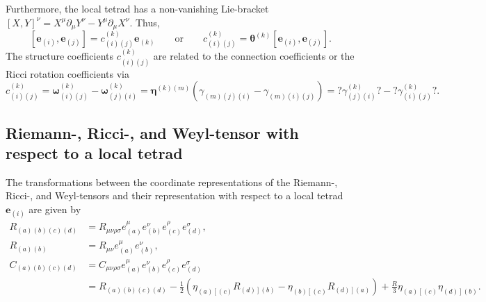 \documentclass[10pt,twoside,notitlepage,a4paper,fleqn,openbib]{report}
\def\antil{\left[\right.}
\def\antir{\left.\right]}
\begin{document}
Furthermore, the local tetrad has a non-vanishing Lie-bracket $[X,Y]^{\nu}=X^{\mu}\partial_{\mu}Y^{\nu}-Y^{\mu}\partial_{\mu}X^{\nu}$. Thus,
\begin{equation}
 \left[\mathbf{e}_{(i)},\mathbf{e}_{(j)}\right]=c_{(i)(j)}^{(k)}\mathbf{e}_{(k)}\qquad\text{or}\qquad c_{(i)(j)}^{(k)} = \boldsymbol{\theta}^{(k)}\left[\mathbf{e}_{(i)},\mathbf{e}_{(j)}\right].
\end{equation}
The structure coefficients $c_{(i)(j)}^{(k)}$ are related to the connection coefficients or the Ricci rotation coefficients via
\begin{equation}
 c_{(i)(j)}^{(k)} = \boldsymbol{\omega}_{(i)(j)}^{(k)}-\boldsymbol{\omega}_{(j)(i)}^{(k)} = \boldsymbol{\eta}^{(k)(m)}\left(\gamma_{(m)(j)(i)}-\gamma_{(m)(i)(j)}\right) = ?\gamma^{(k)}_{(j)(i)}?-?\gamma^{(k)}_{(i)(j)}?.
\end{equation}

\subsection{Riemann-, Ricci-, and Weyl-tensor with respect to a local tetrad}
The transformations between the coordinate representations of the Riemann-, Ricci-, and Weyl-tensors and their representation with respect to a local tetrad $\mathbf{e}_{(i)}$ are given by
\begin{subequations}
 \begin{align}
   R_{(a)(b)(c)(d)} &= R_{\mu\nu\rho\sigma}e_{(a)}^{\mu}e_{(b)}^{\nu}e_{(c)}^{\rho}e_{(d)}^{\sigma},\\
   R_{(a)(b)} &= R_{\mu\nu}e_{(a)}^{\mu}e_{(b)}^{\nu},\\
   \nonumber C_{(a)(b)(c)(d)} &= C_{\mu\nu\rho\sigma}e_{(a)}^{\mu}e_{(b)}^{\nu}e_{(c)}^{\rho}e_{(d)}^{\sigma}\\
   &= R_{(a)(b)(c)(d)} - \frac{1}{2}\left(\eta_{(a)\antil(c)}R_{(d)\antir(b)}-\eta_{(b)\antil(c)}R_{(d)\antir(a)}\right) + \frac{R}{3}\eta_{(a)\antil(c)}\eta_{(d)\antir(b)}.
 \end{align}
\end{subequations}

\end{document}
